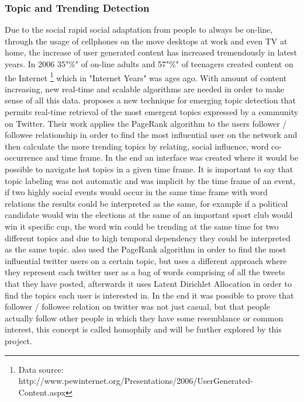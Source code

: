 \subsubsection{Topic and Trending Detection} %
\label{ssub:real_time_topic_and_trending_detection}
Due to the social rapid social adaptation from people to always be on-line, through the usage of cellphones on the move desktops at work and even TV at home, the increase of user generated content has increased tremendously in latest years. In 2006 35"\%" of on-line adults and 57"\%" of teenagers created content on the Internet \footnote{ Data source: http://www.pewinternet.org/Presentations/2006/UserGenerated-Content.aspx} which in "Internet Years" was ages ago.
With amount of content increasing, new real-time and scalable algorithms are needed in order to make sense of all this data.
\citet{Cataldi2010} proposes a new technique for emerging topic detection that permits real-time retrieval of the most emergent topics expressed by a community on Twitter. Their work applies the PageRank \cite{Pagerank1998} algorithm to the users follower / followee relationship in order to find the most influential user on the network and then calculate the more trending topics by relating, social influence, word co-occurrence and time frame. In the end an interface was created where it would be possible to navigate hot topics in a given time frame. It is important to say that topic labeling was not automatic and was implicit by the time frame of an event, if two highly social events would occur in the same time frame with word relations the results could be interpreted as the same, for example if a political candidate would win the elections at the same of an important sport club would win it specific cup, the word win could be trending at the same time for two different topics and due to high temporal dependency they could be interpreted as the same topic.
\citet{Weng2010} also used the PageRank algorithm in order to find the most influential twitter users on a certain topic, but uses a different approach where they represent each twitter user as a bag of words comprising of all the tweets that they have posted, afterwards it uses Latent Dirichlet Allocation \cite{Blei2003} in order to find the topics each user is interested in. In the end it was possible to prove that follower / followee relation on twitter was not just casual, but that people actually follow other people in which they have some resemblance or common interest, this concept is called homophily and will be further explored by this project.

